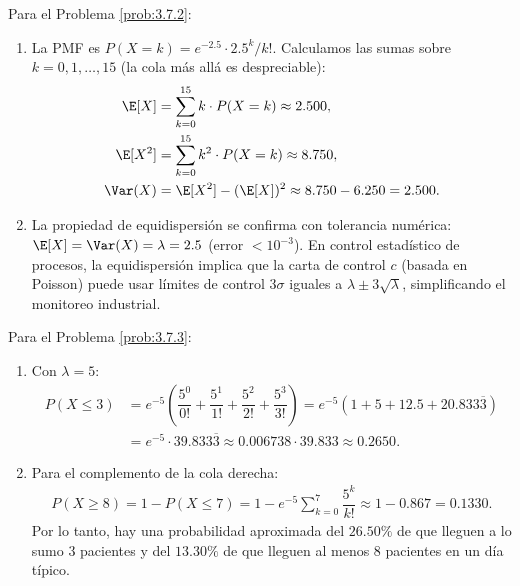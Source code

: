 \begin{solucion}
	\label{sol:3.7.2}
	Para el Problema \ref{prob:3.7.2}:
	\begin{enumerate}
		\item La PMF es $P(X = k) = e^{-2.5} \cdot 2.5^{k} / k!$. Calculamos las sumas sobre $k = 0, 1, \dots, 15$ (la cola más allá es despreciable):
		\begin{align*}
			\E[X] &= \sum_{k=0}^{15} k \cdot P(X=k) \approx 2.500, \\
			\E[X^{2}] &= \sum_{k=0}^{15} k^{2} \cdot P(X=k) \approx 8.750, \\
			\Var(X) &= \E[X^{2}] - (\E[X])^{2} \approx 8.750 - 6.250 = 2.500.
		\end{align*}
		\item La propiedad de equidispersión se confirma con tolerancia numérica: $\E[X] = \Var(X) = \lambda = 2.5$ (error $< 10^{-3}$). En control estadístico de procesos, la equidispersión implica que la carta de control $c$ (basada en Poisson) puede usar límites de control $3\sigma$ iguales a $\lambda \pm 3\sqrt{\lambda}$, simplificando el monitoreo industrial.
	\end{enumerate}
\end{solucion}

\begin{solucion}
	\label{sol:3.7.3}
	Para el Problema \ref{prob:3.7.3}:
	\begin{enumerate}
		\item Con $\lambda = 5$:
		\begin{align*}
			P(X \le 3) &= e^{-5}\left(\dfrac{5^{0}}{0!} + \dfrac{5^{1}}{1!} + \dfrac{5^{2}}{2!} + \dfrac{5^{3}}{3!}\right) = e^{-5}\left(1 + 5 + 12.5 + 20.833\overline{3}\right) \\
			&= e^{-5} \cdot 39.833\overline{3} \approx 0.006738 \cdot 39.833 \approx 0.2650.
		\end{align*}
		\item Para el complemento de la cola derecha:
		\begin{align*}
			P(X \ge 8) = 1 - P(X \le 7) = 1 - e^{-5} \sum_{k=0}^{7} \dfrac{5^{k}}{k!} \approx 1 - 0.867 = 0.1330.
		\end{align*}
		Por lo tanto, hay una probabilidad aproximada del $26.50\%$ de que lleguen a lo sumo $3$ pacientes y del $13.30\%$ de que lleguen al menos $8$ pacientes en un día típico.
	\end{enumerate}
\end{solucion}

